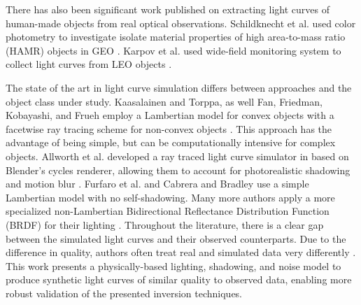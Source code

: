 There has also been significant work published on extracting light curves of human-made objects from real optical observations. Schildknecht et al. used color photometry to investigate isolate material properties of high area-to-mass ratio (HAMR) objects in GEO \cite{schildknecht2008}. Karpov et al. used wide-field monitoring system to collect light curves from LEO objects \cite{karpov2016}.

The state of the art in light curve simulation differs between approaches and the object class under study. Kaasalainen and Torppa, as well Fan, Friedman, Kobayashi, and Frueh employ a Lambertian model for convex objects with a facetwise ray tracing scheme for non-convex objects \cite{kaasalainen2001, fan2016, fan2020thesis,friedman2020,kobayashi2020,frueh2014}. This approach has the advantage of being simple, but can be computationally intensive for complex objects. Allworth et al. developed a ray traced light curve simulator in based on Blender's cycles renderer, allowing them to account for photorealistic shadowing and motion blur \cite{allworth2020, allworth2021}. Furfaro et al. \cite{furfaro2019} and Cabrera and Bradley \cite{cabrera2021,bradley2014} use a simple Lambertian model with no self-shadowing. Many more authors apply a more specialized non-Lambertian Bidirectional Reflectance Distribution Function (BRDF) for their lighting \cite{linares2018space, mcnally2021, blacketer2022}. Throughout the literature, there is a clear gap between the simulated light curves and their observed counterparts. Due to the difference in quality, authors often treat real and simulated data very differently \cite{allworth2021}. This work presents a physically-based lighting, shadowing, and noise model to produce synthetic light curves of similar quality to observed data, enabling more robust validation of the presented inversion techniques.




